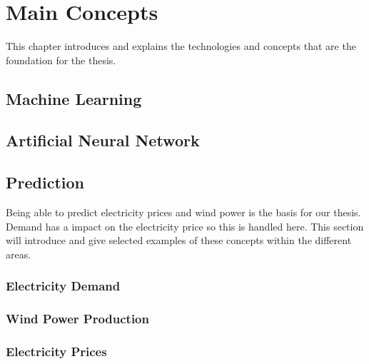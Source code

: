 \documentclass[twoside,11pt,openright]{report}
\begin{document}

\chapter{Main Concepts}
This chapter introduces and explains the technologies and concepts that are the foundation for the thesis.
\label{ch:foundations}
\section{Machine Learning}
\label{sec:machineLearning}


\newpage
\section{Artificial Neural Network}
\label{sec:annSection}


\newpage
\section{Prediction}
\label{sec:predictionSection}
Being able to predict electricity prices and wind power is the basis for our thesis. Demand has a impact on the electricity price so this is handled here. This section will introduce and give selected examples of these concepts within the different areas. 

\subsection{Electricity Demand}
\label{sec:ElectricityDemand}


\subsection{Wind Power Production}


\subsection{Electricity Prices}
\label{sec:electriciyPrices}

\end{document}
